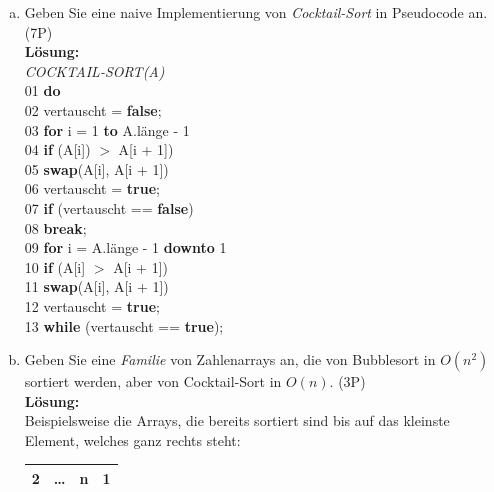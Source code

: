 \documentclass{scrartcl}
\begin{document}
\begin{enumerate}[(1)]
\begin{enumerate}[(a)]
\item Geben Sie eine naive Implementierung von \emph{Cocktail-Sort} in Pseudocode an. (7P)\\
\textbf{Lösung:}\\
\textit{COCKTAIL-SORT(A)}\\
01 \tab \textbf{do} \\
02 \tab \tab vertauscht = \textbf{false};\\
03 \tab \tab \textbf{for} i = 1 \textbf{to} A.länge - 1\\
04 \tab \tab \tab \textbf{if} (A[i]) $>$ A[i + 1])\\
05 \tab \tab \tab \tab \textbf{swap}(A[i], A[i + 1])\\
06 \tab \tab \tab \tab vertauscht = \textbf{true};\\
07 \tab \tab \textbf{if} (vertauscht == \textbf{false})\\
08 \tab \tab \tab \textbf{break};\\
09 \tab \tab \textbf{for} i = A.länge - 1 \textbf{downto} 1\\
10 \tab \tab \tab \textbf{if} (A[i] $>$ A[i + 1])\\
11 \tab \tab \tab \tab \textbf{swap}(A[i], A[i + 1])\\
12 \tab \tab \tab \tab vertauscht = \textbf{true};\\
13 \tab \textbf{while} (vertauscht == \textbf{true});
\item Geben Sie eine \emph{Familie} von Zahlenarrays an, die von Bubblesort in $O(n^2)$ sortiert werden, aber von Cocktail-Sort in $O(n)$. (3P)\\
\textbf{Lösung:}\\
Beispielsweise die Arrays, die bereits sortiert sind bis auf das kleinste Element, welches ganz rechts steht:
\text{ } \\
\begin{center}
\begin{tabular}{|c|c|c|c|}
\hline
2 & \ldots & n & 1 \\
\hline
\end{tabular}
\end{center}
\end{enumerate}
\end{enumerate}
\pagebreak
\end{document}
